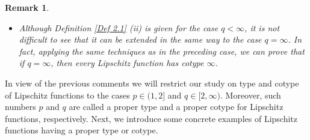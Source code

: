 \documentclass[12pt]{amsart}
\newtheorem{remark}[theorem]{Remark}
\def\T{\mathcal{T}}
\def\Lip{\mathrm{Lip}_0}
\def\Lipnorm{\mathrm{Lip}}
\begin{document}
\begin{remark}
\begin{itemize}
		Hence $f \in \T_p^{\Lip}(X,E)$ with $\|f\|_{\T_p^{\Lipnorm}} = \Lipnorm(f)$.

		\item[$(iv)$] Although Definition \ref{Def 2.1} (ii) is given for the case $q < \infty$, it is not difficult to see that it can be extended in the same way to the case $q = \infty$. In fact, applying the same techniques as in the preceding case, we can prove that if $q=\infty$, then every Lipschitz function has cotype $\infty$.
	\end{itemize}
\end{remark}

In view of the previous comments we will restrict our study on type and cotype of Lipschitz functions to the cases $p \in (1,2]$ and $q \in [2,\infty)$. Moreover, such numbers $p$ and $q$ are called a proper type and a proper cotype for Lipschitz functions, respectively. Next, we introduce some concrete examples of Lipschitz functions having a proper type or cotype.
\end{document}
